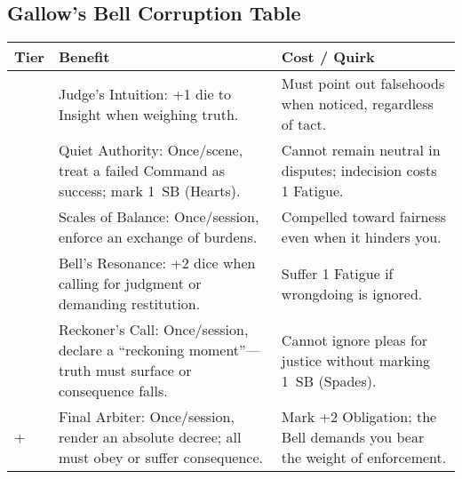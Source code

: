 \subsection*{Gallow’s Bell Corruption Table}
\label{sec:gallows-bell-corruption}

\begin{longtable}{>{\raggedright\arraybackslash}p{1cm} p{5cm} p{5cm}}
\toprule
\textbf{Tier} & \textbf{Benefit} & \textbf{Cost / Quirk} \\
\midrule
1 & Judge’s Intuition: +1 die to Insight when weighing truth. & Must point out falsehoods when noticed, regardless of tact. \\
\midrule
2 & Quiet Authority: Once/scene, treat a failed Command as success; mark 1~SB (Hearts). & Cannot remain neutral in disputes; indecision costs 1 Fatigue. \\
\midrule
3 & Scales of Balance: Once/session, enforce an exchange of burdens. & Compelled toward fairness even when it hinders you. \\
\midrule
4 & Bell’s Resonance: +2 dice when calling for judgment or demanding restitution. & Suffer 1 Fatigue if wrongdoing is ignored. \\
\midrule
5 & Reckoner’s Call: Once/session, declare a “reckoning moment”—truth must surface or consequence falls. & Cannot ignore pleas for justice without marking 1~SB (Spades). \\
\midrule
6+ & Final Arbiter: Once/session, render an absolute decree; all must obey or suffer consequence. & Mark +2 Obligation; the Bell demands you bear the weight of enforcement. \\
\bottomrule
\end{longtable}